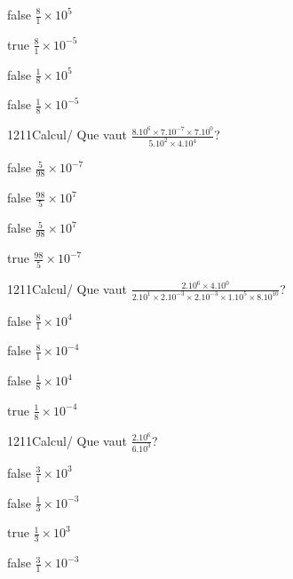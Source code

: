             \begin{reponses}
                \item[false] $\frac{8}{1}\times 10^{5}$
                \item[true] $\frac{8}{1}\times 10^{-5}$
                \item[false] $\frac{1}{8}\times 10^{5}$
                \item[false] $\frac{1}{8}\times 10^{-5}$
            \end{reponses}
            \begin{question}{1211}{Calcul}{}{/}
                Que vaut $\frac{8.10^{6}\times 7.10^{-7}\times 7.10^{0}}{5.10^{2}\times 4.10^{4}}$?
            \end{question}
            \begin{reponses}
                \item[false] $\frac{5}{98}\times 10^{-7}$
                \item[false] $\frac{98}{5}\times 10^{7}$
                \item[false] $\frac{5}{98}\times 10^{7}$
                \item[true] $\frac{98}{5}\times 10^{-7}$
            \end{reponses}
            \begin{question}{1211}{Calcul}{}{/}
                Que vaut $\frac{2.10^{6}\times 4.10^{0}}{2.10^{1}\times 2.10^{-3}\times 2.10^{-3}\times 1.10^{5}\times 8.10^{10}}$?
            \end{question}
            \begin{reponses}
                \item[false] $\frac{8}{1}\times 10^{4}$
                \item[false] $\frac{8}{1}\times 10^{-4}$
                \item[false] $\frac{1}{8}\times 10^{4}$
                \item[true] $\frac{1}{8}\times 10^{-4}$
            \end{reponses}
            \begin{question}{1211}{Calcul}{}{/}
                Que vaut $\frac{2.10^{6}}{6.10^{3}}$?
            \end{question}
            \begin{reponses}
                \item[false] $\frac{3}{1}\times 10^{3}$
                \item[false] $\frac{1}{3}\times 10^{-3}$
                \item[true] $\frac{1}{3}\times 10^{3}$
                \item[false] $\frac{3}{1}\times 10^{-3}$
            \end{reponses}
